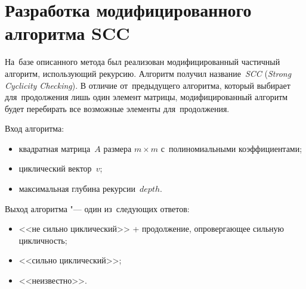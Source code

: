 \section{Разработка модифицированного алгоритма SCC}

На~базе описанного метода был реализован модифицированный частичный алгоритм, использующий рекурсию.
Алгоритм получил название~\emph{SCC}
(\emph{Strong Cyclicity Check\-ing}).
В отличие от~предыдущего алгоритма, который выбирает для~продолжения лишь один элемент матрицы,
модифицированный алгоритм будет перебирать все возможные элементы для~продолжения.

Вход алгоритма:
\begin{itemize}
    \item
        квадратная матрица~$A$ размера $m \times m$ с~полиномиальными коэффициентами;
    \item
        циклический вектор~$v$;
    \item
        максимальная глубина рекурсии~$depth$.
\end{itemize}

Выход алгоритма "--- один из~следующих ответов:
\begin{itemize}
    \item
        <<не сильно циклический>> + продолжение, опровергающее сильную цикличность;
    \item
        <<сильно циклический>>;
    \item
        <<неизвестно>>.
\end{itemize}

